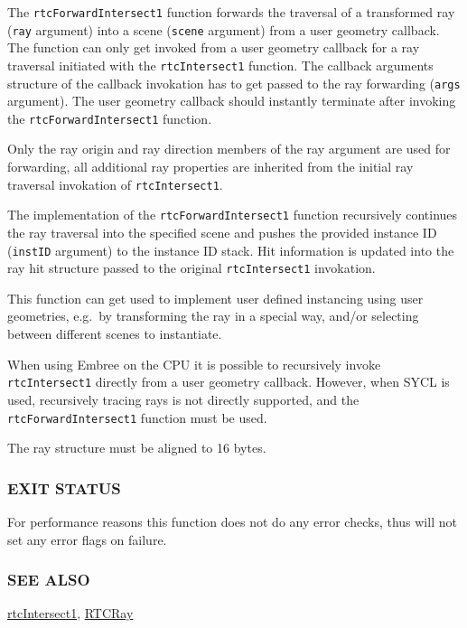 The \texttt{rtcForwardIntersect1} function forwards the traversal of a
transformed ray (\texttt{ray} argument) into a scene (\texttt{scene}
argument) from a user geometry callback. The function can only get
invoked from a user geometry callback for a ray traversal initiated with
the \texttt{rtcIntersect1} function. The callback arguments structure of
the callback invokation has to get passed to the ray forwarding
(\texttt{args} argument). The user geometry callback should instantly
terminate after invoking the \texttt{rtcForwardIntersect1} function.

Only the ray origin and ray direction members of the ray argument are
used for forwarding, all additional ray properties are inherited from
the initial ray traversal invokation of \texttt{rtcIntersect1}.

The implementation of the \texttt{rtcForwardIntersect1} function
recursively continues the ray traversal into the specified scene and
pushes the provided instance ID (\texttt{instID} argument) to the
instance ID stack. Hit information is updated into the ray hit structure
passed to the original \texttt{rtcIntersect1} invokation.

This function can get used to implement user defined instancing using
user geometries, e.g.~by transforming the ray in a special way, and/or
selecting between different scenes to instantiate.

When using Embree on the CPU it is possible to recursively invoke
\texttt{rtcIntersect1} directly from a user geometry callback. However,
when SYCL is used, recursively tracing rays is not directly supported,
and the \texttt{rtcForwardIntersect1} function must be used.

The ray structure must be aligned to 16 bytes.

\subsubsection{EXIT STATUS}\label{exit-status}

For performance reasons this function does not do any error checks, thus
will not set any error flags on failure.

\subsubsection{SEE ALSO}\label{see-also}

\hyperref[rtcintersect1]{rtcIntersect1}, \hyperref[rtcray]{RTCRay}

\pagebreak

